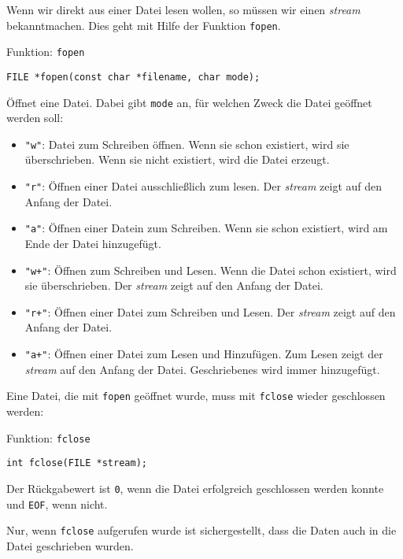 Wenn wir direkt aus einer Datei lesen wollen, so müssen wir einen \emph{stream} bekanntmachen.
Dies geht mit Hilfe der Funktion \verb|fopen|.
\begin{myexampleblock}{Funktion: \texttt{fopen}}
  \begin{lstlisting}
FILE *fopen(const char *filename, char mode);
  \end{lstlisting}
  \vspace{-0.4cm}
  Öffnet eine Datei. Dabei gibt \texttt{mode} an, für welchen Zweck die Datei geöffnet werden soll:
  \begin{itemize} 
    \itemsep0.5ex
  \item \texttt{"w"}: Datei zum Schreiben öffnen. Wenn sie schon existiert, wird sie überschrieben. Wenn sie nicht existiert, wird die Datei erzeugt.
  \item \texttt{"r"}: Öffnen einer Datei ausschließlich zum lesen. Der \emph{stream} zeigt auf den Anfang der Datei.
  \item \texttt{"{}a"}: Öffnen einer Datein zum Schreiben. Wenn sie schon existiert, wird am Ende der Datei hinzugefügt.
  \item \texttt{"w+"}: Öffnen zum Schreiben und Lesen. Wenn die Datei schon existiert, wird sie überschrieben. Der \emph{stream} zeigt auf den Anfang der Datei.
  \item \texttt{"r+"}: Öffnen einer Datei zum Schreiben und Lesen. Der \emph{stream} zeigt auf den Anfang der Datei.
  \item \texttt{"{}a+"}: Öffnen einer Datei zum Lesen und Hinzufügen. Zum Lesen zeigt der \emph{stream} auf den Anfang der Datei. Geschriebenes wird immer hinzugefügt.
  \end{itemize}
\end{myexampleblock}  
Eine Datei, die mit \texttt{fopen} geöffnet wurde, muss mit \texttt{fclose} wieder geschlossen werden:
\begin{myexampleblock}{Funktion: \texttt{fclose}}
  \begin{lstlisting}
int fclose(FILE *stream);
  \end{lstlisting}
  \vspace{-0.4cm}
  Der Rückgabewert ist \texttt{0}, wenn die Datei erfolgreich geschlossen werden konnte und \texttt{EOF}, wenn nicht.
\end{myexampleblock}
Nur, wenn \texttt{fclose} aufgerufen wurde ist sichergestellt, dass die Daten auch in die Datei geschrieben wurden.

